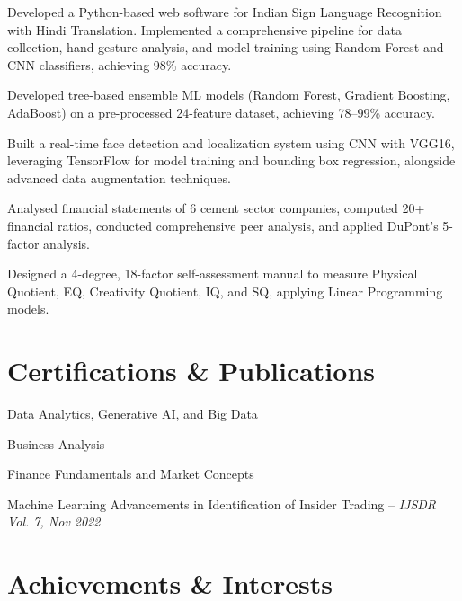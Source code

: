 {Developed a Python-based web software for Indian Sign Language Recognition with Hindi Translation. Implemented a comprehensive pipeline for data collection, hand gesture analysis, and model training using Random Forest and CNN classifiers, achieving 98\% accuracy.}

{Developed tree-based ensemble ML models (Random Forest, Gradient Boosting, AdaBoost) on a pre-processed 24-feature dataset, achieving 78--99\% accuracy.}

{Built a real-time face detection and localization system using CNN with VGG16, leveraging TensorFlow for model training and bounding box regression, alongside advanced data augmentation techniques.}

{Analysed financial statements of 6 cement sector companies, computed 20+ financial ratios, conducted comprehensive peer analysis, and applied DuPont's 5-factor analysis.}

{Designed a 4-degree, 18-factor self-assessment manual to measure Physical Quotient, EQ, Creativity Quotient, IQ, and SQ, applying Linear Programming models.}

\resumeSubHeadingListEnd


\section{Certifications \& Publications}
\resumeSubHeadingListStart

{Data Analytics, Generative AI, and Big Data}

{Business Analysis}

{Finance Fundamentals and Market Concepts}

{Machine Learning Advancements in Identification of Insider Trading -- \textit{IJSDR Vol. 7, Nov 2022}}

\resumeSubHeadingListEnd

\section{Achievements \& Interests}
\resumeSubHeadingListStart
{}
\resumeSubHeadingListEnd
